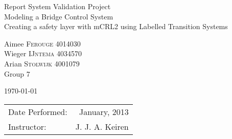 \documentclass{article}
\begin{document}
\centering
\vspace{+150pt}
\LARGE{Report System Validation Project \\
  Modeling a Bridge Control System \\
  Creating a safety layer with mCRL2 using Labelled Transition Systems} %
\vspace{+50pt} %

\Large{Aimee \textsc{Ferouge} 4014030 \\
  Wieger \textsc{IJntema} 4034570 \\
  Arian \textsc{Stolwijk} 4001079 \\
  Group 7} %

\vspace{+50pt} %
\today %
\vspace{+300pt} %

\vfill
\begin{center}
\begin{tabular}{l r}
Date Performed: & January, 2013 \\ %
Instructor: & J. J. A. Keiren %
\end{tabular}
\end{center}

\raggedright
\normalsize



\setcounter{page}{0}


\listoffigures
{}
\listoftables

\newpage
\tableofcontents
\newpage
\pagestyle{plain}
\setcounter{page}{1}
\setcounter{section}{0}

%

%








\end{document}

